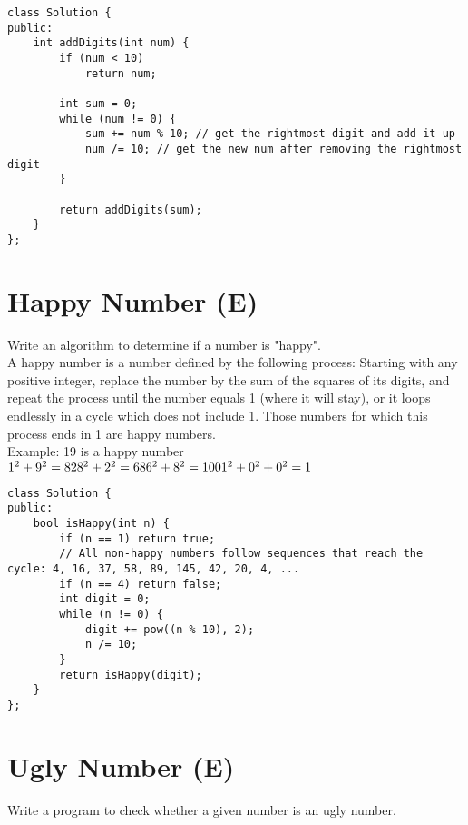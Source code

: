 \begin{lstlisting}
class Solution {
public:
    int addDigits(int num) {
        if (num < 10)
            return num;
        
        int sum = 0;
        while (num != 0) {
            sum += num % 10; // get the rightmost digit and add it up
            num /= 10; // get the new num after removing the rightmost digit
        }
        
        return addDigits(sum);
    }
};
\end{lstlisting}


\section{Happy Number (E)}
Write an algorithm to determine if a number is "happy".\\

A happy number is a number defined by the following process: Starting with any positive integer, replace the number by the sum of the squares of its digits, and repeat the process until the number equals 1 (where it will stay), or it loops endlessly in a cycle which does not include 1. Those numbers for which this process ends in 1 are happy numbers.\\

Example: 19 is a happy number\\

    $1^2 + 9^2 = 82\\
    8^2 + 2^2 = 68\\
    6^2 + 8^2 = 100\\
    1^2 + 0^2 + 0^2 = 1$\\
    
\begin{lstlisting}
class Solution {
public:
    bool isHappy(int n) {
        if (n == 1) return true;
        // All non-happy numbers follow sequences that reach the cycle: 4, 16, 37, 58, 89, 145, 42, 20, 4, ... 
        if (n == 4) return false;
        int digit = 0;
        while (n != 0) {
            digit += pow((n % 10), 2);
            n /= 10;
        }
        return isHappy(digit);
    }
};
\end{lstlisting}


\section{Ugly Number (E)}
Write a program to check whether a given number is an ugly number.\\

